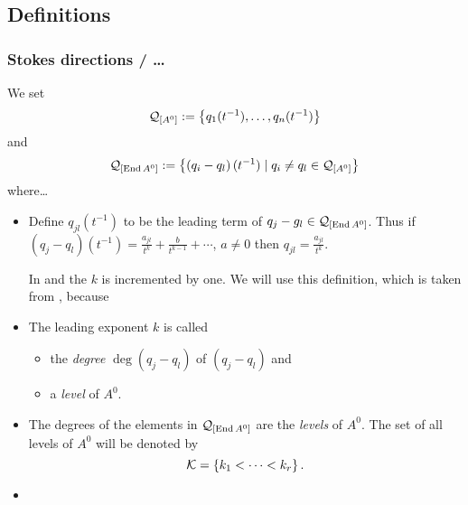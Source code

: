 \subsection{Definitions}
\subsubsection{Stokes directions / \dots}
\begin{comment}
  \cite{Loday1994} \$I.4
\end{comment}
We set
\[
  \mathcal{Q}_{[A^0]}:=\left\{q_1(t^{-1}),\dots,q_n(t^{-1})\right\}
\]
and
\[
  \mathcal{Q}_{[\operatorname{End} A^0]}:=\left\{\left(q_i-q_l\right)(t^{-1})
    \mid q_i \neq q_l \in\mathcal{Q}_{[A^0]}
  \right\}
\]
where\dots
\begin{defn}
  \begin{itemize}
    \item Define $q_{jl}(t^{-1})$ to be the leading term of
      $q_j-g_l\in\mathcal{Q}_{[\operatorname{End} A^0]}$.  Thus if
      $(q_j-q_l)(t^{-1}) =\frac{a_{jl}}{t^k}+\frac{b}{t^{k-1}}+\cdots$,
      $a\neq0$ then $q_{jl}=\frac{a_{jl}}{t^k}$.
      \begin{comment}
        Thus if $(q_j-q_l)(t^{-1})=\frac{a_{jl}}{t^k}+h$ with $h\in o(t^{-k})$
        then $q_{jl}=\frac{a_{jl}}{t^k}$.
      \end{comment}
      \begin{rem}
        In \cite{boalch} and \cite{thboalch} the $k$ is incremented by one. We
        will use this definition, which is taken from \cite{Loday1994}, because
        \TODO
      \end{rem}
    \item The leading exponent $k$ is called
      \begin{itemize}
        \item the \emph{degree} $\deg(q_j-q_l)$ of $(q_j-q_l)$ and
        \item a \emph{level} of $A^0$.
      \end{itemize}
    \item The degrees of the elements in $\mathcal{Q}_{[\operatorname{End} A^0]}$ are the
      \emph{levels} of $A^0$.
      The set of all levels of $A^0$ will be denoted by
      \[
        \mathcal{K}=\{k_1<\dots<k_r\} \,.
      \]
      \begin{comment}
        \begin{rem}
          Levels are rational numbers. The unramified case is the case when
          all levels are integers.
          \TODO[Maby use definitions from \cite{Loday1994} p.857 in case of
            ramification]
        \end{rem}
      \end{comment}
    \item {}
  \end{itemize}
\end{defn}

